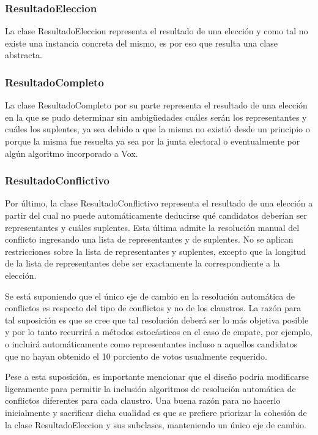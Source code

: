 \subsubsection{ResultadoEleccion}


La clase ResultadoEleccion representa el resultado de una elección y como tal no existe una instancia concreta del mismo, es por eso que resulta una clase abstracta. 

\subsubsection{ResultadoCompleto}
La clase ResultadoCompleto por su parte representa el resultado de una elección en la que se pudo determinar sin ambigüedades cuáles serán los representantes y cuáles los suplentes, ya sea debido a que la misma no existió desde un principio o porque la misma fue resuelta ya sea por la junta electoral o eventualmente por algún algoritmo incorporado a Vox.


\subsubsection{ResultadoConflictivo}
Por último, la clase ResultadoConflictivo representa el resultado de una elección a partir del cual no puede automáticamente deducirse qué candidatos deberían ser representantes y cuáles suplentes. Esta última admite la resolución manual del conflicto ingresando una lista de representantes y de suplentes. No se aplican restricciones sobre la lista de representantes y suplentes, excepto que la longitud de la lista de representantes debe ser exactamente la correspondiente a la elección.




Se está suponiendo que el único eje de cambio en la resolución automática de conflictos es respecto del tipo de conflictos y no de los claustros. La razón para tal suposición es que se cree que tal resolución deberá ser lo más objetiva posible y por lo tanto recurrirá a métodos estocásticos en el caso de empate, por ejemplo, o incluirá automáticamente como representantes incluso a aquellos candidatos que no hayan obtenido el 10 porciento de votos usualmente requerido.

Pese a esta suposición, es importante mencionar que el diseño podría modificarse ligeramente para permitir la inclusión algoritmos de resolución automática de conflictos diferentes para cada claustro. Una buena razón para no hacerlo inicialmente y sacrificar dicha cualidad es que se prefiere priorizar la cohesión de la clase ResultadoEleccion y sus subclases, manteniendo un único eje de cambio.


